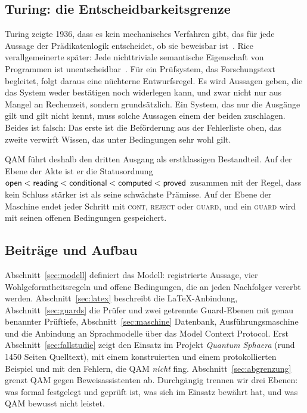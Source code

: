 \subsection{Turing: die Entscheidbarkeitsgrenze}

Turing zeigte 1936, dass es kein mechanisches Verfahren gibt, das für jede Aussage der Prädikatenlogik entscheidet, ob sie
beweisbar ist~\cite{turing}. Rice verallgemeinerte später: Jede nichttriviale semantische Eigenschaft von Programmen ist
unentscheidbar~\cite{rice}. Für ein Prüfsystem, das Forschungstext begleitet, folgt daraus eine nüchterne Entwurfsregel. Es wird
Aussagen geben, die das System weder bestätigen noch widerlegen kann, und zwar nicht nur aus Mangel an Rechenzeit, sondern
grundsätzlich. Ein System, das nur die Ausgänge \glqq gilt\grqq{} und \glqq gilt nicht\grqq{} kennt, muss solche Aussagen einem
der beiden zuschlagen. Beides ist falsch: Das erste ist die Beförderung aus der Fehlerliste oben, das zweite verwirft Wissen,
das unter Bedingungen sehr wohl gilt.

QAM führt deshalb den dritten Ausgang als erstklassigen Bestandteil. Auf der Ebene der Akte ist er die Statusordnung
\(\textsf{open}<\textsf{reading}<\textsf{conditional}<\textsf{computed}<\textsf{proved}\) zusammen mit der Regel, dass kein Schluss stärker ist als seine
schwächste Prämisse. Auf der Ebene der Maschine endet jeder Schritt mit \textsc{cont}, \textsc{reject} oder \textsc{guard}, und ein
\textsc{guard} wird mit seinen offenen Bedingungen gespeichert.

\subsection{Beiträge und Aufbau}

Abschnitt~\ref{sec:modell} definiert das Modell: registrierte Aussage, vier Wohlgeformtheitsregeln und offene Bedingungen, die an jeden
Nachfolger vererbt werden. Abschnitt~\ref{sec:latex} beschreibt die \LaTeX-Anbindung, Abschnitt~\ref{sec:guards} die Prüfer und zwei
getrennte Guard-Ebenen mit genau benannter Prüftiefe, Abschnitt~\ref{sec:maschine} Datenbank, Ausführungsmaschine und die Anbindung an
Sprachmodelle über das Model Context Protocol. Erst Abschnitt~\ref{sec:fallstudie} zeigt den Einsatz im Projekt \emph{Quantum Sphaera}
(rund 1450 Seiten Quelltext), mit einem konstruierten und einem protokollierten Beispiel und mit den Fehlern, die QAM \emph{nicht} fing.
Abschnitt~\ref{sec:abgrenzung} grenzt QAM gegen Beweisassistenten ab.
Durchgängig trennen wir drei Ebenen: was formal festgelegt und geprüft ist, was sich im Einsatz bewährt hat, und was QAM bewusst
nicht leistet.
